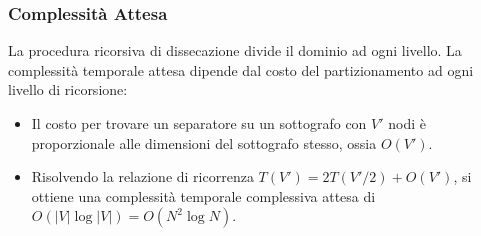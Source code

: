 \documentclass[twocolumn]{article}
\begin{document}
\subsubsection{Complessit\`a Attesa}
La procedura ricorsiva di dissecazione divide il dominio ad ogni livello. La complessit\`a temporale attesa dipende dal costo del partizionamento ad ogni livello di ricorsione:
\begin{itemize}
    \item Il costo per trovare un separatore su un sottografo con $V'$ nodi \`e proporzionale alle dimensioni del sottografo stesso, ossia $O(V')$.
    \item Risolvendo la relazione di ricorrenza $T(V') = 2 T(V'/2) + O(V')$, si ottiene una complessit\`a temporale complessiva attesa di $O(|V| \log |V|) = O(N^2 \log N)$.
\end{itemize}
\end{document}
